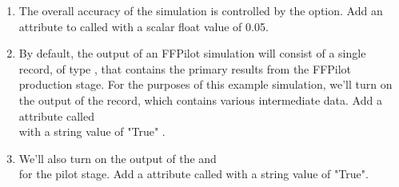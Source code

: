 \begin{enumerate}
\begin{enumerate}
        \begin{enumerate}
            \item The overall accuracy of the simulation is controlled by the  option. Add an attribute to  called  with a scalar float value of 0.05.
            \item By default, the output of an FFPilot simulation will consist of a single record, of type , that contains the primary results from the FFPilot production stage. For the purposes of this example simulation, we'll turn on the output of the  record, which contains various intermediate data. Add a  attribute called \\
             with a string value of "True" .
            \item We'll also turn on the output of the  and \\
             for the pilot stage. Add a  attribute called  with a string value of "True".
        \end{enumerate}
    \end{enumerate}
\end{enumerate}
